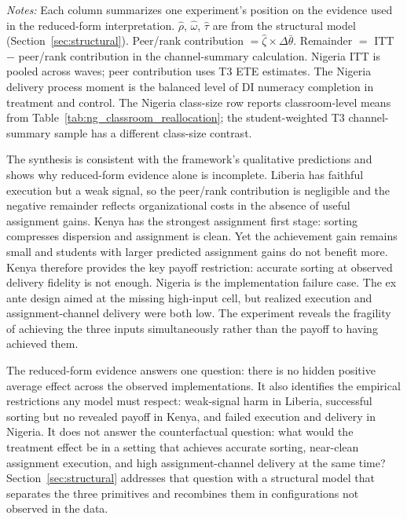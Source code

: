 \documentclass[11pt]{article}
\begin{document}
\begin{table}[H]
\begin{threeparttable}
\begin{tablenotes}
\footnotesize
\item \textit{Notes:} Each column summarizes one experiment's position on the evidence used in the reduced-form interpretation. $\hat{\rho}$, $\hat{\omega}$, $\hat{\tau}$ are from the structural model (Section~\ref{sec:structural}). Peer/rank contribution $= \hat{\zeta} \times \Delta\bar{\theta}$. Remainder $=$ ITT $-$ peer/rank contribution in the channel-summary calculation. Nigeria ITT is pooled across waves; peer contribution uses T3 ETE estimates. The Nigeria delivery process moment is the balanced level of DI numeracy completion in treatment and control. The Nigeria class-size row reports classroom-level means from Table~\ref{tab:ng_classroom_reallocation}; the student-weighted T3 channel-summary sample has a different class-size contrast.
\end{tablenotes}
\end{threeparttable}
\end{table}

The synthesis is consistent with the framework's qualitative predictions and shows why reduced-form evidence alone is incomplete. Liberia has faithful execution but a weak signal, so the peer/rank contribution is negligible and the negative remainder reflects organizational costs in the absence of useful assignment gains. Kenya has the strongest assignment first stage: sorting compresses dispersion and assignment is clean. Yet the achievement gain remains small and students with larger predicted assignment gains do not benefit more. Kenya therefore provides the key payoff restriction: accurate sorting at observed delivery fidelity is not enough. Nigeria is the implementation failure case. The ex ante design aimed at the missing high-input cell, but realized execution and assignment-channel delivery were both low. The experiment reveals the fragility of achieving the three inputs simultaneously rather than the payoff to having achieved them.

The reduced-form evidence answers one question: there is no hidden positive average effect across the observed implementations. It also identifies the empirical restrictions any model must respect: weak-signal harm in Liberia, successful sorting but no revealed payoff in Kenya, and failed execution and delivery in Nigeria. It does not answer the counterfactual question: what would the treatment effect be in a setting that achieves accurate sorting, near-clean assignment execution, and high assignment-channel delivery at the same time? Section~\ref{sec:structural} addresses that question with a structural model that separates the three primitives and recombines them in configurations not observed in the data.
\end{document}
